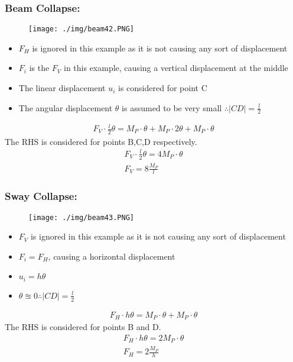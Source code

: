 \subsubsection{Beam Collapse:}
\begin{figure}[H]
  \centering
  \texttt{[image: ./img/beam42.PNG]}
\end{figure}
\begin{itemize}
  \item $F_H$ is ignored in this example as it is not causing any sort of displacement
  \item $F_i$ is the $F_V$ in this example, causing a vertical displacement at the middle
  \item The linear displacement $u_i$ is considered for point C
  \item The angular displacement $\theta$ is assumed to be very small $\therefore |CD| = \frac{l}{2}$
\end{itemize}
\begin{gather}
  F_V\cdot\frac{l}{2}\theta = M_P\cdot\theta + M_P\cdot 2\theta + M_P \cdot\theta
\end{gather}
The RHS is considered for points B,C,D respectively.
\begin{gather}
  F_V\cdot\frac{l}{2}\theta = 4M_P\cdot\theta \\
  F_V = 8\frac{M_P}{l}
\end{gather}
\subsubsection{Sway Collapse:}
\begin{figure}[H]
  \centering
  \texttt{[image: ./img/beam43.PNG]}
\end{figure}
\begin{itemize}
  \item $F_V$ is ignored in this example as it is not causing any sort of displacement
  \item $F_i = F_H$, causing a horizontal displacement
  \item $u_i = h\theta$
  \item $\theta \approxeq 0 \therefore |CD| = \frac{l}{2}$
\end{itemize}
\begin{gather}
  F_H\cdot h\theta = M_P\cdot\theta + M_P\cdot\theta
\end{gather}
The RHS is considered for points B and D.
\begin{gather}
  F_H\cdot h\theta = 2M_P\cdot\theta \\
  F_H = 2\frac{M_P}{h}
\end{gather}
